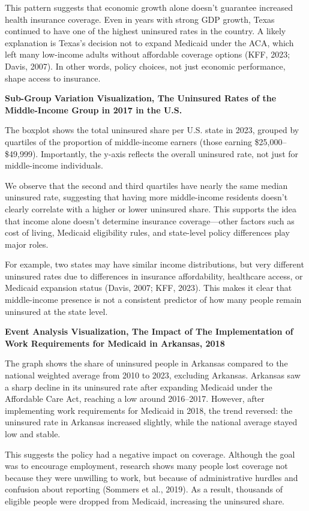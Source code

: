 \documentclass[
]{article}
\begin{document}
This pattern suggests that economic growth alone doesn't guarantee
increased health insurance coverage. Even in years with strong GDP
growth, Texas continued to have one of the highest uninsured rates in
the country. A likely explanation is Texas's decision not to expand
Medicaid under the ACA, which left many low-income adults without
affordable coverage options (KFF, 2023; Davis, 2007). In other words,
policy choices, not just economic performance, shape access to
insurance.

\textbf{Sub-Group Variation Visualization, The Uninsured Rates of the
Middle-Income Group in 2017 in the U.S.}

The boxplot shows the total uninsured share per U.S. state in 2023,
grouped by quartiles of the proportion of middle-income earners (those
earning \$25,000--\$49,999). Importantly, the y-axis reflects the
overall uninsured rate, not just for middle-income individuals.

We observe that the second and third quartiles have nearly the same
median uninsured rate, suggesting that having more middle-income
residents doesn't clearly correlate with a higher or lower uninsured
share. This supports the idea that income alone doesn't determine
insurance coverage---other factors such as cost of living, Medicaid
eligibility rules, and state-level policy differences play major roles.

For example, two states may have similar income distributions, but very
different uninsured rates due to differences in insurance affordability,
healthcare access, or Medicaid expansion status (Davis, 2007; KFF,
2023). This makes it clear that middle-income presence is not a
consistent predictor of how many people remain uninsured at the state
level.

\textbf{Event Analysis Visualization, The Impact of The Implementation
of Work Requirements for Medicaid in Arkansas, 2018}

The graph shows the share of uninsured people in Arkansas compared to
the national weighted average from 2010 to 2023, excluding Arkansas.
Arkansas saw a sharp decline in its uninsured rate after expanding
Medicaid under the Affordable Care Act, reaching a low around
2016--2017. However, after implementing work requirements for Medicaid
in 2018, the trend reversed: the uninsured rate in Arkansas increased
slightly, while the national average stayed low and stable.

This suggests the policy had a negative impact on coverage. Although the
goal was to encourage employment, research shows many people lost
coverage not because they were unwilling to work, but because of
administrative hurdles and confusion about reporting (Sommers et al.,
2019). As a result, thousands of eligible people were dropped from
Medicaid, increasing the uninsured share.
\end{document}
